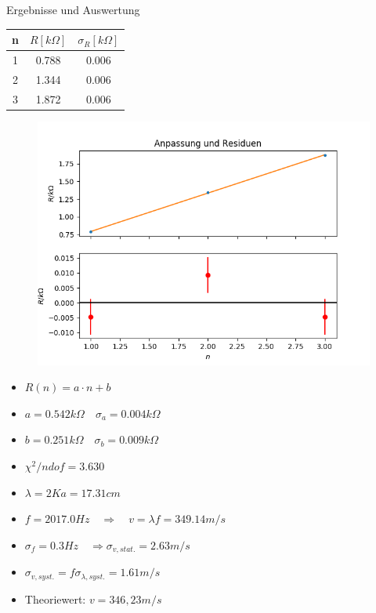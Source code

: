 \documentclass[12pt]{beamer}
\begin{document}
	\begin{frame}{Ergebnisse und Auswertung}
	\begin{table}
	\begin{tabular}{|c|c|c|}
	\hline 
	n & $R[k\Omega]$ & $\sigma_R[k\Omega]$ \\ 
	\hline 
	1 & 0.788 & 0.006 \\ 
	\hline 
	2 & 1.344 & 0.006 \\ 
	\hline 
	3 & 1.872 & 0.006 \\ 
	\hline 
	\end{tabular} 
	\end{table}
	
	\begin{figure}
	\includegraphics[scale=0.37]{fitdruckknoten}
	\end{figure}
	\end{frame}
	
	\begin{frame}
	\begin{itemize}
	\item $R(n)=a \cdot n+b$
	\item $a=0.542k\Omega \quad \sigma_{a}=0.004k\Omega$
	\item $b=0.251k\Omega \quad \sigma_b=0.009k\Omega$
	\item $\chi^2/ndof=3.630$
	\item $\lambda=2Ka=17.31cm$
	\item $f=2017.0Hz \quad \Rightarrow \quad v=\lambda f = 349.14m/s$
	\item $\sigma_f=0.3Hz \quad \Rightarrow \sigma_{v,stat.}=2.63m/s$
	\item $\sigma_{v,syst.}=f \sigma_{\lambda,syst.}=1.61m/s$ \\ [0,4cm]
	\item Theoriewert: $v=346,23 m/s$
	\end{itemize}
	\end{frame}
	
\end{document}
